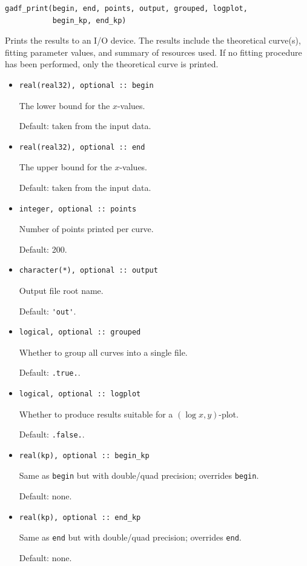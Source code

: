 \documentclass{article}
\begin{document}
\begin{verbatim}
gadf_print(begin, end, points, output, grouped, logplot,
           begin_kp, end_kp)
\end{verbatim}
Prints the results to an I/O device. The results include the theoretical curve(s), fitting parameter values, and summary of resources used. If no fitting procedure has been performed, only the theoretical curve is printed.
\begin{itemize}
\item
\begin{verbatim}
real(real32), optional :: begin
\end{verbatim}
  The lower bound for the $x$-values.

  Default: taken from the input data.
\item
\begin{verbatim}
real(real32), optional :: end
\end{verbatim}
  The upper bound for the $x$-values.

  Default: taken from the input data.
\item
\begin{verbatim}
integer, optional :: points
\end{verbatim}
  Number of points printed per curve.

  Default: 200.
\item
\begin{verbatim}
character(*), optional :: output
\end{verbatim}
  Output file root name.

  Default: \verb+'out'+.
\item
\begin{verbatim}
logical, optional :: grouped
\end{verbatim}
  Whether to group all curves into a single file.

  Default: \verb+.true.+.
\item
\begin{verbatim}
logical, optional :: logplot
\end{verbatim}
  Whether to produce results suitable for a $(\log x,y)$-plot.

  Default: \verb+.false.+.
\item
\begin{verbatim}
real(kp), optional :: begin_kp
\end{verbatim}
  Same as \verb+begin+ but with double/quad precision; overrides
  \verb+begin+.

  Default: none.
\item
\begin{verbatim}
real(kp), optional :: end_kp
\end{verbatim}
  Same as \verb+end+ but with double/quad precision; overrides
  \verb+end+.

  Default: none.
\end{itemize}
\end{document}
